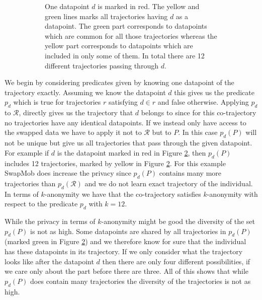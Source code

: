 \documentclass[12pt]{article}
\newcommand{\data}{d}
\newcommand{\traj}{r}
\newcommand{\cotraj}{\mathcal{R}}
\newcommand{\pred}{p}
\newcommand{\paths}{P}
\theoremstyle{definition}
\begin{document}
\begin{figure}
\begin{subfigure}[t]{0.49\textwidth}
    \caption{One datapoint \(\data\) is marked in red. The yellow and
      green lines marks all trajectories having \(\data\) as a
      datapoint. The green part corresponds to datapoints which are
      common for all those trajectories whereas the yellow part
      corresponds to datapoints which are included in only some of
      them. In total there are 12 different trajectories passing
      through \(\data\).}
    \label{fig:graph-swap-big-example-marked}
  \end{subfigure}
  \caption{}
\end{figure}

We begin by considering predicates given by knowing one datapoint of
the trajectory exactly. Assuming we know the datapoint \(\data\) this
gives us the predicate \(\pred_{\data}\) which is true for
trajectories \(\traj\) satisfying \(\data \in \traj\) and false
otherwise. Applying \(\pred_{\data}\) to \(\cotraj\), directly gives
us the trajectory that \(\data\) belongs to since for this
co-trajectory no trajectories have any identical datapoints. If we
instead only have access to the swapped data we have to apply it not
to \(\cotraj\) but to \(\paths\). In this case
\(\pred_{\data}(\paths)\) will not be unique but give us all
trajectories that pass through the given datapoint. For example if
\(\data\) is the datapoint marked in red in Figure
\ref{fig:graph-swap-big-example-marked}, then
\(\pred_{\data}(\paths)\) includes 12 trajectories, marked by yellow
in Figure \ref{fig:graph-swap-big-example-marked}. For this example
SwapMob does increase the privacy since \(\pred_{\data}(\paths)\)
contains many more trajectories than \(\pred_{\data}(\cotraj)\) and we
do not learn exact trajectory of the individual. In terms of
\(k\)-anonymity we have that the co-trajectory satisfies
\(k\)-anonymity with respect to the predicate \(\pred_{\data}\) with
\(k = 12\).

While the privacy in terms of \(k\)-anonymity might be good the
diversity of the set \(\pred_{\data}(\paths)\) is not as high. Some
datapoints are shared by all trajectories in
\(\pred_{\data}(\paths)\) (marked green in Figure
\ref{fig:graph-swap-big-example-marked}) and we therefore know for
sure that the individual has these datapoints in its trajectory. If
we only consider what the trajectory looks like after the datapoint
\(\data\) then there are only four different possibilities, if we care
only about the part before there are three. All of this shows that
while \(\pred_{\data}(\paths)\) does contain many trajectories the
diversity of the trajectories is not as high.
\end{document}
